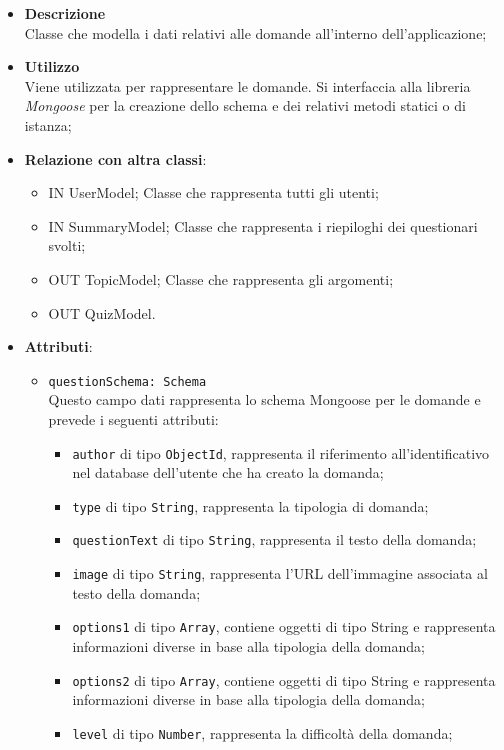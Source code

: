 	\begin{itemize}
		\item \textbf{Descrizione} \\
		Classe che modella i dati relativi alle domande all'interno dell'applicazione;	
		\item \textbf{Utilizzo} \\
		Viene utilizzata per rappresentare le domande. Si interfaccia alla libreria \textit{Mongoose} per la creazione dello schema e dei relativi metodi statici o di istanza;
		\item \textbf{Relazione con altra classi}:
			\begin{itemize}
			\item IN UserModel;
			Classe che rappresenta tutti gli utenti;
			\item IN SummaryModel;
			Classe che rappresenta i riepiloghi dei questionari svolti;
			\item OUT TopicModel;
			Classe che rappresenta gli argomenti;
			\item OUT QuizModel.
			\end{itemize}
		\item \textbf{Attributi}:
	\begin{itemize}
		\item \texttt{questionSchema: Schema} \\
		Questo campo dati rappresenta lo schema Mongoose per le domande e prevede i seguenti attributi:
		\begin{itemize}
			\item \texttt{author} di tipo \texttt{ObjectId}, rappresenta il riferimento all'identificativo nel database dell'utente che ha creato la domanda;
			\item \texttt{type} di tipo \texttt{String}, rappresenta la tipologia di domanda;
			\item \texttt{questionText} di tipo \texttt{String}, rappresenta il testo della domanda; 
			\item \texttt{image} di tipo \texttt{String}, rappresenta l'URL dell'immagine associata al testo della domanda;
			\item \texttt{options1} di tipo \texttt{Array}, contiene oggetti di tipo String e rappresenta informazioni diverse in base alla tipologia della	 domanda;
			\item \texttt{options2} di tipo \texttt{Array}, contiene oggetti di tipo String e rappresenta informazioni diverse in base alla tipologia della	 domanda;
			\item \texttt{level} di tipo \texttt{Number}, rappresenta la difficoltà della domanda;

\end{itemize}
\end{itemize}
\end{itemize}
